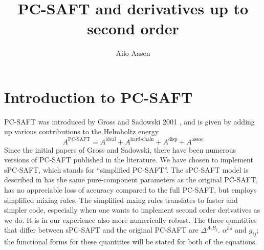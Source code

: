 \documentclass[english]{../thermomemo/thermomemo}
\title{PC-SAFT and derivatives up to second order}
\author{Ailo Aasen}
\begin{document}
\frontmatter
\tableofcontents

\section{Introduction to PC-SAFT}
PC-SAFT was introduced by Gross and Sadowski 2001 \cite{Gross01,Gross02}, and is given by adding up various contributions to the Helmholtz energy
\begin{equation}
  \label{eq:PC-SAFT}
  A^{\text{PC-SAFT}} = A^{\text{ideal}} + A^{\text{hard-chain}} + A^{\text{disp}} + A^{\text{assoc}}
\end{equation}
Since the initial papers of Gross and Sadowski, there have been numerous
versions of PC-SAFT published in the literature. We have chosen to implement
sPC-SAFT, which stands for ``simplified PC-SAFT''. The sPC-SAFT model is
described in \cite{Kontogeorgis10} has the same pure-component parameters as the
original PC-SAFT, has no appreciable loss of accuracy compared to the full
PC-SAFT, but employs simplified mixing rules. The simplified mxing rules
translates to faster and simpler code, especially when one wants to implement
second order derivatives as we do. It is in our experience also more numerically
robust. The three quantities that differ between sPC-SAFT and the original
PC-SAFT are $\Delta^{A_i B_j}$. $\alpha^{hs}$ and $g_{ij}$; the functional forms
for these quantities will be stated for both of the equations.
\end{document}
